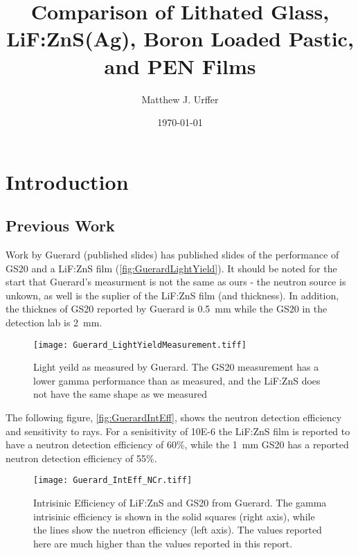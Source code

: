 \documentclass[draftcls,onecolumn]{IEEEtran}
\begin{document}
\title{Comparison of Lithated Glass, LiF:ZnS(Ag), Boron Loaded Pastic, and PEN Films}
\author{Matthew J. Urffer}
\date{\today}
\maketitle

\tableofcontents
\listoffigures
\listoftables
\section{Introduction}

\subsection{Previous Work}

Work by Guerard (published slides) has published slides of the performance of GS20 and a LiF:ZnS film (\autoref{fig:GuerardLightYield}).
It should be noted for the start that Guerard's measurment is not the same as ours - the neutron source is unkown, as well is the suplier of the LiF:ZnS film (and thickness). 
In addition, the thicknes of GS20 reported by Guerard is \SI{0.5}{\mm} while the GS20 in the detection lab is \SI{2}{\mm}.
\begin{figure}
  \centering
  \texttt{[image: Guerard\_LightYieldMeasurement.tiff]}
  \caption[Measured Light Yield (Guerard)]{Light yeild as measured by Guerard. The GS20 measurement has a lower gamma performance than as measured, and the LiF:ZnS does not have the same shape as we measured}
	\label{fig:GuerardLightYield}
\end{figure}
The following figure, \autoref{fig:GuerardIntEff}, shows the neutron detection efficiency and sensitivity to  rays.
For a senisitivity of \num{10E-6} the LiF:ZnS film is reported to have a neutron detection efficiency of 60\%, while the \SI{1}{\mm} GS20 has a reported neutron detection efficiency of 55\%.
\begin{figure}
  \centering
  \texttt{[image: Guerard\_IntEff\_NCr.tiff]}
  \caption[Intrisinic Efficiency (Geurard)]{Intrisinic Efficiency of LiF:ZnS and GS20 from Guerard.  The gamma intrisinic efficiency is shown in the solid squares (right axis), while the lines show the nuetron efficiency (left axis). The values reported here are much higher than the values reported in this report.}
	\label{fig:GuerardIntEff}
\end{figure}
\end{document}
